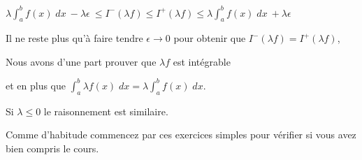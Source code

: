 $\lambda \int_a^b f(x)\; dx \  -\lambda \epsilon \ \le I^-(\lambda f) \le I^+(\lambda f) \le  \lambda \int_a^b f(x)\; dx \ +\lambda \epsilon$

\change

Il ne reste plus qu'à faire tendre $\epsilon \to 0$ pour obtenir que 
$I^-(\lambda f) = I^+(\lambda f)$,


\change

Nous avons d'une part prouver que $\lambda f$ est intégrable

et en plus que $\int_a^b \lambda f(x)\; dx = \lambda \int_a^b f(x)\; dx$.

Si $\lambda \le 0$ le raisonnement est similaire.


\diapo

Comme d'habitude commencez par ces exercices simples pour 
vérifier si vous avez bien compris le cours.


